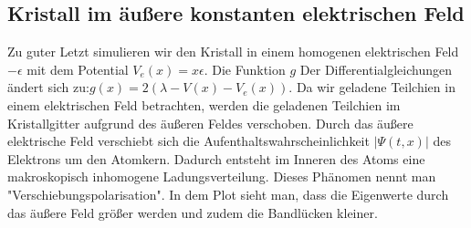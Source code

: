 \documentclass[ngerman]{scrartcl}
\begin{document}
\subsection{Kristall im äußere konstanten elektrischen Feld}
	Zu guter Letzt simulieren wir den Kristall in einem homogenen elektrischen Feld $- \epsilon$ mit dem Potential $V_e(x) = x \epsilon$.
	Die Funktion $g$ Der Differentialgleichungen ändert sich zu:$g(x) = 2(\lambda - V(x) - V_e(x))$.
	Da wir geladene Teilchien in einem elektrischen Feld betrachten, werden die geladenen Teilchien im Kristallgitter aufgrund des äußeren Feldes verschoben.
	Durch das äußere elektrische Feld verschiebt sich die Aufenthaltswahrscheinlichkeit ${|\Psi(t,x)|}$ des Elektrons um den Atomkern.
	Dadurch entsteht im Inneren des Atoms eine makroskopisch inhomogene Ladungsverteilung.
	Dieses Phänomen nennt man "Verschiebungspolarisation".
	In dem Plot sieht man, dass die Eigenwerte durch das äußere Feld größer werden und zudem die Bandlücken kleiner.
\end{document}
